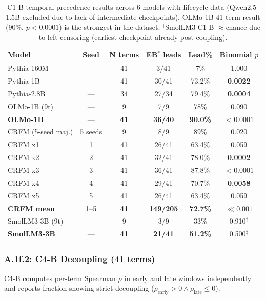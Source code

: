 \documentclass[10pt]{article} %
\begin{document}
\begin{table}[H]
\centering
\small
\begin{tabular}{|l|c|c|c|c|c|}
\hline
\textbf{Model} & \textbf{Seed} & \textbf{N terms} & \textbf{EB$^*$ leads} & \textbf{Lead\%} & \textbf{Binomial $p$} \\
\hline
Pythia-160M & --- & 41 & 3/41 & 7\% & 1.000 \\
Pythia-1B & --- & 41 & 30/41 & 73.2\% & \textbf{0.0022} \\
Pythia-2.8B & --- & 34 & 27/34 & 79.4\% & \textbf{0.0004} \\
OLMo-1B (9t) & --- & 9 & 7/9 & 78\% & 0.090 \\
\textbf{OLMo-1B} & --- & \textbf{41} & \textbf{36/40} & \textbf{90.0\%} & $\mathbf{<0.0001}$ \\
CRFM (5-seed maj.) & 5 seeds & 9 & 8/9 & 89\% & 0.020 \\
CRFM x1 & 1 & 41 & 26/41 & 63.4\% & 0.059 \\
CRFM x2 & 2 & 41 & 32/41 & 78.0\% & \textbf{0.0002} \\
CRFM x3 & 3 & 41 & 36/41 & 87.8\% & $\mathbf{<0.0001}$ \\
CRFM x4 & 4 & 41 & 29/41 & 70.7\% & \textbf{0.0058} \\
CRFM x5 & 5 & 41 & 26/41 & 63.4\% & 0.059 \\
\textbf{CRFM mean} & 1--5 & \textbf{41} & \textbf{149/205} & \textbf{72.7\%} & $\mathbf{\ll 0.001}$ \\
SmolLM3-3B (9t) & --- & 9 & 3/9 & 33\% & 0.910$^\ddagger$ \\
\textbf{SmolLM3-3B} & --- & \textbf{41} & \textbf{21/41} & \textbf{51.2\%} & 0.500$^\ddagger$ \\
\hline
\end{tabular}
\caption{C1-B temporal precedence results across 6 models with lifecycle data (Qwen2.5-1.5B excluded due to lack of intermediate checkpoints). OLMo-1B 41-term result (90\%, $p<0.0001$) is the strongest in the dataset. $^\ddagger$SmolLM3 C1-B $\approx$chance due to left-censoring (earliest checkpoint already post-coupling).}
\label{tab:a1f1_c1b}
\end{table}

\subsubsection*{A.1f.2: C4-B Decoupling (41 terms)}

C4-B computes per-term Spearman $\rho$ in early and late windows independently and reports fraction showing strict decoupling ($\rho_{\text{early}} > 0 \land \rho_{\text{late}} \leq 0$).
\end{document}
